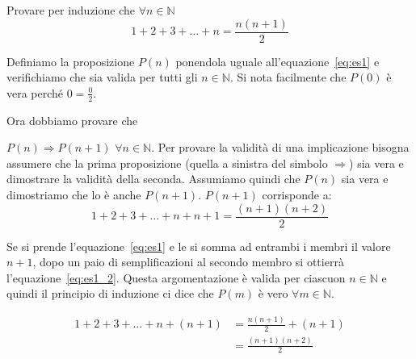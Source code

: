 \begin{ese}
	Provare per induzione che $\forall n \in \mathbb{N}$
	\begin{equation}
		\label{eq:es1}
		1 + 2 + 3 + \dots + n = \frac{n(n+1)}{2}
	\end{equation}
	
	Definiamo la proposizione $P(n)$ ponendola uguale all'equazione~\eqref{eq:es1} e verifichiamo che sia valida per tutti gli $n \in \mathbb{N}$.
	Si nota facilmente che $P(0)$ è vera perché $0 = \frac{0}{2}$.
	
	Ora dobbiamo provare che \item $ P(n) \Rightarrow P(n+1) $  $\forall n \in \mathbb{N}$. Per provare la validità di una implicazione bisogna assumere che la prima proposizione (quella a sinistra del simbolo $\Rightarrow$) sia vera e dimostrare la validità della seconda. Assumiamo quindi che $P(n)$ sia vera e dimostriamo che lo è anche $P(n+1)$.
	$P(n+1)$ corrisponde a:
	\begin{equation}
		\label{eq:es1_2}
		1 + 2 + 3 + \dots + n + n+1 = \frac{(n+1)(n+2)}{2}
	\end{equation}
	
	Se si prende l'equazione~\eqref{eq:es1} e le si somma ad entrambi i membri il valore $n+1$, dopo un paio di semplificazioni al secondo membro si ottierrà
	l'equazione~\eqref{eq:es1_2}. Questa argomentazione è valida per ciascuon $n \in \mathbb{N}$ e quindi il principio di induzione ci dice che $P(m)$ è vero
	$\forall m \in \mathbb{N}$.
	
	\begin{equation*}
		\begin{split}
			1 + 2 + 3 + \dots + n + (n + 1)  &= \frac{n(n+1)}{2} + (n+1) \\
														& = \frac{(n+1)(n+2)}{2}
		\end{split}
	\end{equation*}
	\QEDA
\end{ese}

